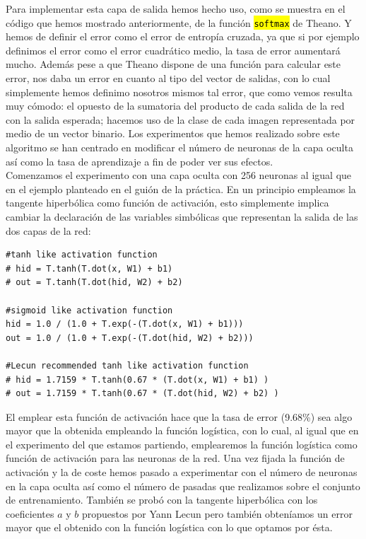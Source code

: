 \documentclass[10pt,a4paper]{article}
\newcommand{\code}[1]{\sethlcolor{light-gray}\hl{\texttt{#1}}} %
\begin{document}
Para implementar esta capa de salida hemos hecho uso, como se muestra en el código que hemos mostrado anteriormente, de la función \code{softmax} de Theano. Y hemos de definir el error como el error de entropía cruzada, ya que si por ejemplo definimos el error como el error cuadrático medio, la tasa de error aumentará mucho. Además pese a que Theano dispone de una función para calcular este error, nos daba un error en cuanto al tipo del vector de salidas, con lo cual simplemente hemos definimo nosotros mismos tal error, que como vemos resulta muy cómodo: el opuesto de la sumatoria del producto de cada salida de la red con la salida esperada; hacemos uso de la clase de cada imagen representada por medio de un vector binario. Los experimentos que hemos realizado sobre este algoritmo se han centrado en modificar el número de neuronas de la capa oculta así como la tasa de aprendizaje a fin de poder ver sus efectos.\\

Comenzamos el experimento con una capa oculta con 256 neuronas al igual que en el ejemplo planteado en el guión de la práctica. En un principio empleamos la tangente hiperbólica como función de activación, esto simplemente implica cambiar la declaración de las variables simbólicas que representan la salida de las dos capas de la red:

\begin{lstlisting}
#tanh like activation function
# hid = T.tanh(T.dot(x, W1) + b1)
# out = T.tanh(T.dot(hid, W2) + b2)

#sigmoid like activation function
hid = 1.0 / (1.0 + T.exp(-(T.dot(x, W1) + b1)))
out = 1.0 / (1.0 + T.exp(-(T.dot(hid, W2) + b2)))

#Lecun recommended tanh like activation function
# hid = 1.7159 * T.tanh(0.67 * (T.dot(x, W1) + b1) )
# out = 1.7159 * T.tanh(0.67 * (T.dot(hid, W2) + b2) )
\end{lstlisting}

El emplear esta función de activación hace que la tasa de error (9.68\%) sea algo mayor que la obtenida empleando la función logística, con lo cual, al igual que en el experimento del que estamos partiendo, emplearemos la función logística como función de activación para las neuronas de la red. Una vez fijada la función de activación y la de coste hemos pasado a experimentar con el número de neuronas en la capa oculta así como el número de pasadas que realizamos sobre el conjunto de entrenamiento. También se probó con la tangente hiperbólica con los coeficientes $a$ y $b$ propuestos por Yann Lecun pero también obteníamos un error mayor que el obtenido con la función logística con lo que optamos por ésta.\\
\end{document}
